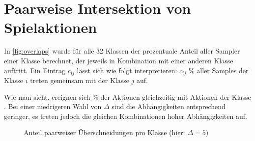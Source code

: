 \chapter{Paarweise Intersektion von Spielaktionen}
\label{ch:overlaps}

In \autoref{fig:overlaps} wurde für alle 32 Klassen der prozentuale Anteil aller Sampler einer Klasse berechnet, der jeweils in Kombination mit einer anderen Klasse auftritt.
Ein Eintrag $c_{ij}$ lässt sich wie folgt interpretieren:
$c_{ij}$ \% aller Samples der Klasse $i$ treten gemeinsam mit der Klasse $j$ auf.

Wie man sieht, ereignen sich  \% der Aktionen  gleichzeitig mit Aktionen der Klasse .
Bei einer niedrigeren Wahl von $\Delta$ sind die Abhängigkeiten entsprechend geringer, es treten jedoch die gleichen Kombinationen hoher Abhängigkeiten auf.

\begin{figure}
    \centering
    \caption{Anteil paarweiser Überschneidungen pro Klasse (hier: $\Delta = 5$)}
    \label{fig:overlaps}
\end{figure}
